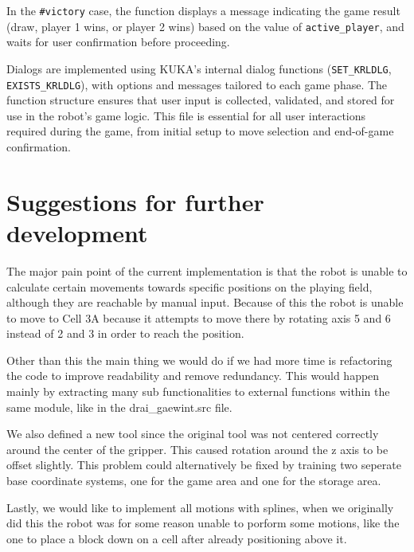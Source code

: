 \documentclass{article}
\begin{document}
            In the \texttt{\#victory} case, the function displays a message indicating the game result (draw, player 1 wins, or player 2 wins) based on the value of \texttt{active\_player}, and waits for user confirmation before proceeding.

            Dialogs are implemented using KUKA's internal dialog functions (\texttt{SET\_KRLDLG}, \texttt{EXISTS\_KRLDLG}), with options and messages tailored to each game phase. The function structure ensures that user input is collected, validated, and stored for use in the robot's game logic. This file is essential for all user interactions required during the game, from initial setup to move selection and end-of-game confirmation.

    \newpage
    \section{Suggestions for further development}
        The major pain point of the current implementation is that the robot is unable to calculate certain movements towards specific positions on the playing field, although they are reachable by manual input. Because of this the robot is unable to move to Cell 3A because it attempts to move there by rotating axis 5 and 6 instead of 2 and 3 in order to reach the position. 

        Other than this the main thing we would do if we had more time is refactoring the code to  improve readability and remove redundancy. This would happen mainly by extracting many sub functionalities to external functions within the same module, like in the drai\_gaewint.src file. 

        We also defined a new tool since the original tool was not centered correctly around the center of the gripper. This caused rotation around the z axis to be offset slightly. This problem could alternatively be fixed by training two seperate base coordinate systems, one for the game area and one for the storage area.
        
        Lastly, we would like to implement all motions with splines, when we originally did this the robot was for some reason unable to porform some motions, like the one to place a block down on a cell after already positioning above it. 

    \newpage
\end{document}
